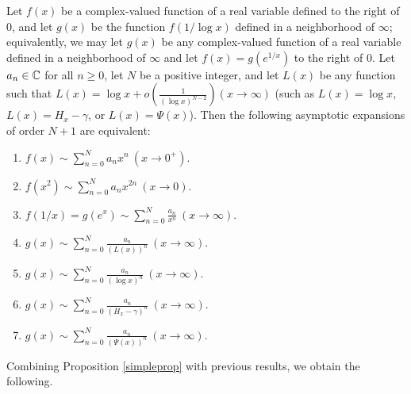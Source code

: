 \documentclass[12pt]{article}
\begin{document}
\begin{proposition}\label{simpleprop}
Let $f(x)$ be a complex-valued function of a real variable defined to the right of $0$, and let $g(x)$ be the function $f(1/\log x)$ defined in a neighborhood of $\infty$; equivalently, we may let  $g(x)$ be any complex-valued function  of a real variable defined in a neighborhood of $\infty$ and let $f(x) = g(e^{1/x})$ to the right of $0$. Let $a_n \in {\mathbb C}$ for all $n \geq 0$, let $N$ be a positive integer, and let $L(x)$ be any function such that $L(x) = \log x + o \left(\frac{1}{(\log x)^{N-2}} \right) (x \to \infty)$ (such as $L(x) = \log x$, $L(x) = H_x - \gamma$, or $L(x) = \Psi(x)$). Then the following asymptotic expansions of order $N+1$  are equivalent:
\begin{enumerate}
\item $ \displaystyle f(x) \sim \sum_{n = 0}^N a_n x^n \ (x \to 0^+).$
\item $ \displaystyle f(x^2) \sim \sum_{n = 0}^N a_n x^{2n} \ (x \to 0).$
\item $ f(1/x) = \displaystyle g(e^x) \sim \sum_{n = 0}^N \frac{a_n }{x^n }\ (x \to \infty).$
\item $\displaystyle g(x) \sim \sum_{n = 0}^N \frac{a_n }{(L(x))^n} \ (x \to \infty)$.
\item $ \displaystyle g(x) \sim \sum_{n = 0}^N \frac{a_n }{(\log x)^n }\ (x \to \infty).$
\item $ \displaystyle g(x) \sim \sum_{n = 0}^N \frac{a_n }{(H_x - \gamma)^n} \ (x \to \infty).$
\item $ \displaystyle g(x) \sim \sum_{n = 0}^N \frac{a_n }{(\Psi(x))^n} \ (x \to \infty).$
\end{enumerate}
\end{proposition}





Combining Proposition \ref{simpleprop} with previous results, we obtain the following.
\end{document}
